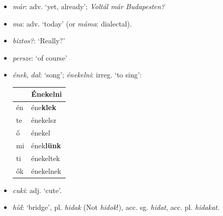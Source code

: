 \documentclass[a4paper,11pt]{article}
\begin{document}
\begin{itemize}
  \item \emph{már}: adv. `yet, already'; \emph{Voltál már Budapesten?}

  \item \emph{ma}: adv. `today' (or \emph{máma}: dialectal).

  \item \emph{biztos?}: `Really?'

  \item \emph{persze}: `of course'

  \item \emph{ének}, \emph{dal}: `song'; \emph{énekelni}: irreg. `to
    sing':
    \begin{center}
      \begin{tabular}{ll}
        & Énekelni\\
        \hline
        én & éne\textbf{klek} \\
        te & énekelsz \\
        ő  & énekel \\
        mi & ének\textbf{lünk} \\
        ti & énekeltek \\
        ők & énekelnek
      \end{tabular}
    \end{center}

  \item \emph{cuki}: adj. `cute'.

  \item \emph{híd}: `bridge', pl. \emph{hidak} (Not \emph{hidok}!),
    acc. sg. \emph{hidat}, acc. pl. \emph{hidakat}.

\end{itemize}
\end{document}
